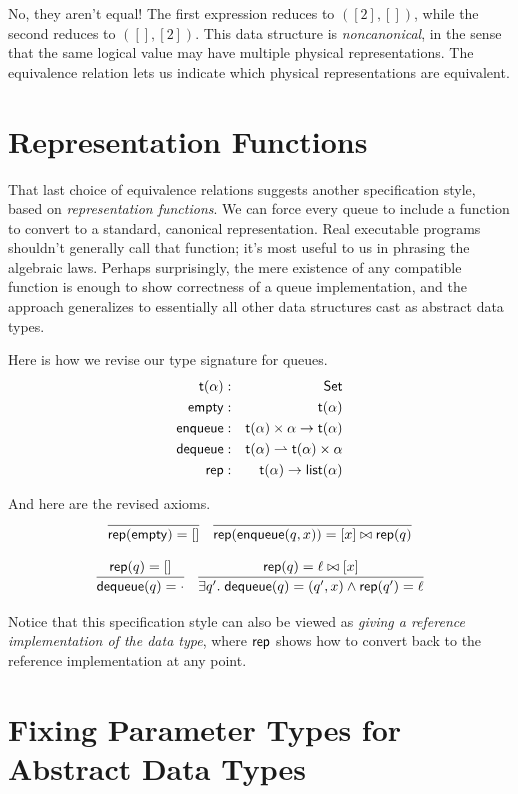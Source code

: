 \documentclass{amsbook}
\theoremstyle{definition}
\theoremstyle{remark}
\numberwithin{section}{chapter}
\numberwithin{equation}{chapter}
\begin{document}
No, they aren't equal!  The first expression reduces to $([2], [])$, while the second reduces to $([], [2])$.
This data structure is \emph{noncanonical}, in the sense that the same logical value may have multiple physical representations.
The equivalence relation lets us indicate which physical representations are equivalent.

\section{Representation Functions}

That last choice of equivalence relations suggests another specification style, based on \emph{representation functions}.
We can force every queue to include a function to convert to a standard, canonical representation.
Real executable programs shouldn't generally call that function; it's most useful to us in phrasing the algebraic laws.
Perhaps surprisingly, the mere existence of any compatible function is enough to show correctness of a queue implementation, and the approach generalizes to essentially all other data structures cast as abstract data types.

Here is how we revise our type signature for queues.
\begin{eqnarray*}
  \mathsf{t}(\alpha) &:& \mathsf{Set} \\
  \mathsf{empty} &:& \mathsf{t}(\alpha) \\
  \mathsf{enqueue} &:& \mathsf{t}(\alpha) \times \alpha \to \mathsf{t}(\alpha) \\
  \mathsf{dequeue} &:& \mathsf{t}(\alpha) \rightharpoonup \mathsf{t}(\alpha) \times \alpha \\
  \mathsf{rep} &:& \mathsf{t}(\alpha) \to \mathsf{list}(\alpha)
\end{eqnarray*}

And here are the revised axioms.
$$\infer{\mt{rep}(\mt{empty}) = []}{}
\quad \infer{\mt{rep}(\mt{enqueue}(q, x)) = \concat{[x]}{\mt{rep}(q)}}{}$$

$$\infer{\mt{dequeue}(q) = \cdot}{\mt{rep}(q) = []}
\quad \infer{\exists q'. \; \mt{dequeue}(q) = (q', x) \land \mt{rep}(q') = \ell}{\mt{rep}(q) = \concat{\ell}{[x]}}$$

Notice that this specification style can also be viewed as \emph{giving a reference implementation of the data type}, where $\mathsf{rep}$ shows how to convert back to the reference implementation at any point.

\section{Fixing Parameter Types for Abstract Data Types}
\end{document}

